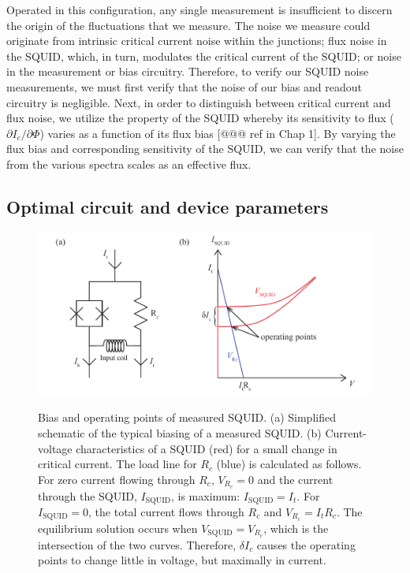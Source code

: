 Operated in this configuration, any single measurement is insufficient to discern the origin of the fluctuations that we measure. The noise we measure could originate from intrinsic critical current noise within the junctions; flux noise in the SQUID, which, in turn, modulates the critical current of the SQUID; or noise in the measurement or bias circuitry. Therefore, to verify our SQUID noise measurements, we must first verify that the noise of our bias and readout circuitry is negligible. Next, in order to distinguish between critical current and flux noise, we utilize the property of the SQUID whereby its sensitivity to flux ($\partial I_c/\partial\Phi$) varies as a function of its flux bias [@@@ ref in Chap 1]. By varying the flux bias and corresponding sensitivity of the SQUID, we can verify that the noise from the various spectra scales as an effective flux.

\subsection{Optimal circuit and device parameters}

\begin{figure}
\centering\includegraphics{experimental/Fig_loadline}\\
\caption[Bias and operating points of measured SQUID]{Bias and operating points of measured SQUID. (a) Simplified schematic of the typical biasing of a measured SQUID. (b) Current-voltage characteristics of a SQUID (red) for a small change in critical current. The load line for $R_c$ (blue) is calculated as follows. For zero current flowing through $R_c$, $V_{R_c} = 0$ and the current through the SQUID, $I_{\text{SQUID}}$, is maximum: $I_{\text{SQUID}} = I_t$. For $I_{\text{SQUID}} = 0$, the total current flows through $R_c$ and $V_{R_c} = I_t R_c$. The equilibrium solution occurs when $V_{\text{SQUID}} = V_{R_c}$, which is the intersection of the two curves. Therefore, $\delta I_c$ causes the operating points to change little in voltage, but maximally in current.}
\label{fig:experimental:loadline}
\end{figure}

